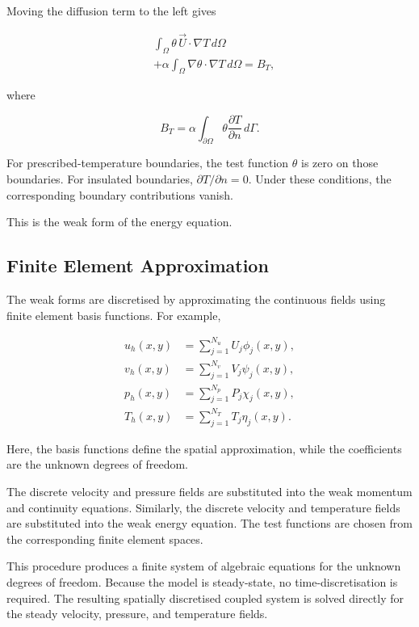 \documentclass[preprint,3p,number]{elsarticle}
\begin{document}
Moving the diffusion term to the left gives

\begin{equation}
\boxed{
\begin{aligned}
&\int_\Omega \theta\,\vec{U}\cdot\nabla T\,d\Omega\\
&+\alpha\int_\Omega
\nabla\theta\cdot\nabla T\,d\Omega=B_T,
\end{aligned}
}
\end{equation}

where

\begin{equation}
B_T=\alpha\int_{\partial\Omega}
\theta\frac{\partial T}{\partial n}\,d\Gamma.
\end{equation}

For prescribed-temperature boundaries, the test function
$\theta$ is zero on those boundaries. For insulated boundaries,
$\partial T/\partial n=0$. Under these conditions, the
corresponding boundary contributions vanish.

This is the weak form of the energy equation.

\subsection{Finite Element Approximation}

The weak forms are discretised by approximating the
continuous fields using finite element basis functions.
For example,

\begin{align}
u_h(x,y)&=\sum_{j=1}^{N_u}U_j\phi_j(x,y),\\
v_h(x,y)&=\sum_{j=1}^{N_v}V_j\psi_j(x,y),\\
p_h(x,y)&=\sum_{j=1}^{N_p}P_j\chi_j(x,y),\\
T_h(x,y)&=\sum_{j=1}^{N_T}T_j\eta_j(x,y).
\end{align}

Here, the basis functions define the spatial approximation,
while the coefficients are the unknown degrees of freedom.

The discrete velocity and pressure fields are substituted
into the weak momentum and continuity equations. Similarly,
the discrete velocity and temperature fields are substituted
into the weak energy equation. The test functions are
chosen from the corresponding finite element spaces.

This procedure produces a finite system of algebraic
equations for the unknown degrees of freedom. Because the model is steady-state, no time-discretisation
is required. The resulting spatially discretised coupled
system is solved directly for the steady velocity, pressure,
and temperature fields.
\end{document}
